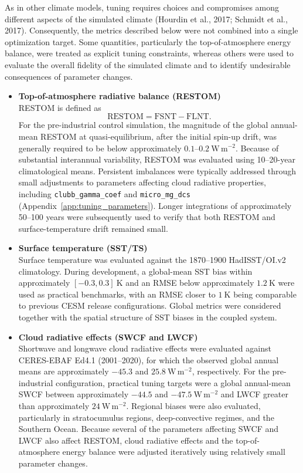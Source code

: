\documentclass[draft]{agujournal2019}
\begin{document}
As in other climate models, tuning requires choices and compromises among different aspects of the simulated climate (Hourdin et al., 2017; Schmidt et al., 2017). Consequently, the metrics described below were not combined into a single optimization target. Some quantities, particularly the top-of-atmosphere energy balance, were treated as explicit tuning constraints, whereas others were used to evaluate the overall fidelity of the simulated climate and to identify undesirable consequences of parameter changes.

 \begin{itemize}
 \item \textbf{Top-of-atmosphere radiative balance (RESTOM)} \\
 RESTOM is defined as \begin{equation} \mathrm{RESTOM} = \mathrm{FSNT} - \mathrm{FLNT}. \end{equation} For the pre-industrial control simulation, the magnitude of the global annual-mean RESTOM at quasi-equilibrium, after the initial spin-up drift, was generally required to be below approximately $0.1$--$0.2~\mathrm{W\,m^{-2}}$. Because of substantial interannual variability, RESTOM was evaluated using 10--20-year climatological means. Persistent imbalances were typically addressed through small adjustments to parameters affecting cloud radiative properties, including \texttt{clubb\_gamma\_coef} and \texttt{micro\_mg\_dcs} (Appendix~\ref{app:tuning_parameters}). Longer integrations of approximately 50--100 years were subsequently used to verify that both RESTOM and surface-temperature drift remained small. 
 
 \item \textbf{Surface temperature (SST/TS)} \\ 
 Surface temperature was evaluated against the 1870--1900 HadISST/OI.v2 climatology. During development, a global-mean SST bias within approximately $[-0.3,0.3]~\mathrm{K}$ and an RMSE below approximately $1.2~\mathrm{K}$ were used as practical benchmarks, with an RMSE closer to $1~\mathrm{K}$ being comparable to previous CESM release configurations. Global metrics were considered together with the spatial structure of SST biases in the coupled system. 
 
 \item \textbf{Cloud radiative effects (SWCF and LWCF)} \\
 Shortwave and longwave cloud radiative effects were evaluated against CERES-EBAF Ed4.1 (2001--2020), for which the observed global annual means are approximately $-45.3$ and $25.8~\mathrm{W\,m^{-2}}$, respectively. For the pre-industrial configuration, practical tuning targets were a global annual-mean SWCF between approximately $-44.5$ and $-47.5~\mathrm{W\,m^{-2}}$ and LWCF greater than approximately $24~\mathrm{W\,m^{-2}}$. Regional biases were also evaluated, particularly in stratocumulus regions, deep-convective regimes, and the Southern Ocean. Because several of the parameters affecting SWCF and LWCF also affect RESTOM, cloud radiative effects and the top-of-atmosphere energy balance were adjusted iteratively using relatively small parameter changes. 
 

\end{itemize}
\end{document}
